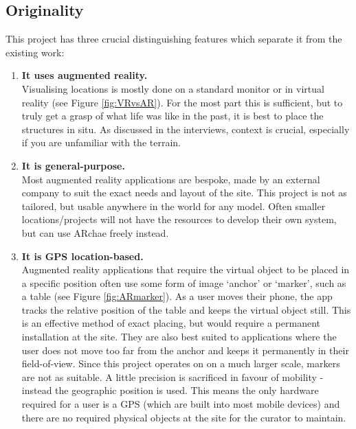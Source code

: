 \documentclass[12pt, a4paper]{article}
\begin{document}
\subsection{Originality}
This project has three crucial distinguishing features which separate it from the existing work:
\begin{enumerate}
    \item \textbf{It uses augmented reality.} \\
    Visualising locations is mostly done on a standard monitor or in virtual reality (see Figure \ref{fig:VRvsAR}). For the most part this is sufficient, but to truly get a grasp of what life was like in the past, it is best to place the structures in situ. As discussed in the interviews, context is crucial, especially if you are unfamiliar with the terrain.
    \item \textbf{It is general-purpose.} \\
    Most augmented reality applications are bespoke, made by an external company to suit the exact needs and layout of the site. This project is not as tailored, but usable anywhere in the world for any model. Often smaller locations/projects will not have the resources to develop their own system, but can use ARchae freely instead.
    \item \textbf{It is GPS location-based.} \\
    Augmented reality applications that require the virtual object to be placed in a specific position often use some form of image `anchor' or `marker', such as a table (see Figure \ref{fig:ARmarker}). As a user moves their phone, the app tracks the relative position of the table and keeps the virtual object still. This is an effective method of exact placing, but would require a permanent installation at the site. They are also best suited to applications where the user does not move too far from the anchor and keeps it permanently in their field-of-view. Since this project operates on on a much larger scale, markers are not as suitable. A little precision is sacrificed in favour of mobility - instead the geographic position is used. This means the only hardware required for a user is a GPS (which are built into most mobile devices) and there are no required physical objects at the site for the curator to maintain. 

\end{enumerate}
\end{document}
